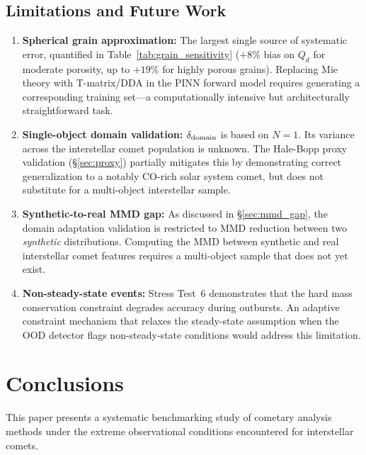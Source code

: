 \documentclass[usenatbib]{mnras}
\begin{document}
\subsection{Limitations and Future Work}

\begin{enumerate}
    \item \textbf{Spherical grain approximation:} The largest single source of systematic error, quantified in Table~\ref{tab:grain_sensitivity} ($+8\%$ bias on $Q_d$ for moderate porosity, up to $+19\%$ for highly porous grains). Replacing Mie theory with T-matrix/DDA in the PINN forward model requires generating a corresponding training set---a computationally intensive but architecturally straightforward task.
    \item \textbf{Single-object domain validation:} $\delta_{\rm domain}$ is based on $N=1$. Its variance across the interstellar comet population is unknown. The Hale-Bopp proxy validation (\S\ref{sec:proxy}) partially mitigates this by demonstrating correct generalization to a notably CO-rich solar system comet, but does not substitute for a multi-object interstellar sample.
    \item \textbf{Synthetic-to-real MMD gap:} As discussed in \S\ref{sec:mmd_gap}, the domain adaptation validation is restricted to MMD reduction between two \textit{synthetic} distributions. Computing the MMD between synthetic and real interstellar comet features requires a multi-object sample that does not yet exist.
    \item \textbf{Non-steady-state events:} Stress Test~6 demonstrates that the hard mass conservation constraint degrades accuracy during outbursts. An adaptive constraint mechanism that relaxes the steady-state assumption when the OOD detector flags non-steady-state conditions would address this limitation.
\end{enumerate}

\section{Conclusions}\label{sec:conclusions}

This paper presents a systematic benchmarking study of cometary analysis methods under the extreme observational conditions encountered for interstellar comets.
\end{document}
